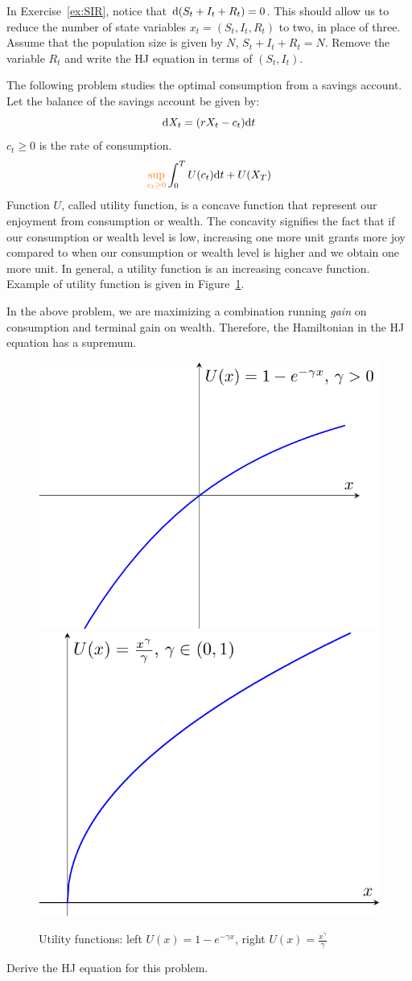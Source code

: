 \documentclass[11pt]{book}
\newcommand{\dd}{\text{\normalfont d}}
\newcommand{\dt}{\text{\normalfont d}t}
\begin{document}
\begin{ex}
    In Exercise~\ref{ex:SIR}, notice that $\dd(S_t+I_t+R_t)=0$. This should allow us to reduce the number of state variables $x_t=(S_t,I_t,R_t)$ to two, in place of three. Assume that the population size is given by $N$, $S_t+I_t+R_t=N$. Remove the variable $R_t$ and write the HJ equation in terms of $(S_t,I_t)$.
\end{ex}

\begin{ex}\label{ex:consumption}
    The following problem studies the optimal consumption from a savings account. Let the balance of the savings account be given by: 
        \[
        \dd{X}_t = (rX_t - c_t)\dt
        \]
        $c_t\ge0$ is the rate of consumption.
        \[
        {\color{orange}\sup_{c_t\ge0}}\int_0^T U(c_t)\dt + U(X_T)
        \]
        Function $U$, called utility function, is a concave function that represent our enjoyment from consumption or wealth. The concavity signifies the fact that if our consumption or wealth level is low, increasing one more unit grants more joy compared to when our consumption or wealth level is higher and we obtain one more unit. In general, a utility function is an increasing concave function. Example of utility function is given in Figure~\ref{fig:utilities}.
        
        In the above problem, we are maximizing a combination running \emph{gain} on consumption and terminal gain on wealth. Therefore, the Hamiltonian in the HJ equation has a {\color{orange}supremum}. 

        \begin{figure}
            \centering
            \includegraphics[width=0.35\linewidth]{Control_lecture_notes/Figs/utility1.pdf}\includegraphics[width=0.35\linewidth]{Control_lecture_notes/Figs/utility2.pdf}
            \caption{Utility functions: left $U(x)=1-e^{-\gamma x}$, right $U(x)=\frac{x^{\gamma}}{\gamma}$}
            \label{fig:utilities}
        \end{figure}
        
        Derive the HJ equation for this problem.
\end{ex}
\end{document}
